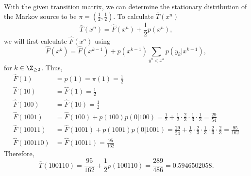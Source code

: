 \documentclass[
  coursecode={MTHE 477},
  assignmentname={Homework \homeworknumber},
  studentnumber=20053722,
  name={Bryan Hoang},
  draft,
  final,
]{
  ltxanswer%
}
\begin{document}
  \begin{questions}
    \setcounter{question}{\questionnumber}
    \addtocounter{question}{-1}
    \question[20]\
    \begin{parts}
      \part{}
      \begin{solution}
        With the given transition matrix, we can determine the stationary distribution of the Markov source to be \(\pi = (\frac{1}{2}, \frac{1}{2})\). To calculate \(\bar{T}(x^{n})\)
        \begin{equation*}
          \bar{T}(x^{n}) = \hat{F}(x^{n}) + \frac{1}{2} p(x^{n}),
        \end{equation*}
        we will first calculate \(\hat{F}(x^{n})\) using
        \begin{equation*}
          \hat{F}(x^{k}) = \hat{F}(x^{k-1}) + p(x^{k-1}) \sum_{y^{k} < x^{k}} p(y_{k}|x^{k-1}),
        \end{equation*}
        for \(k\in\Z_{\ge2}\). Thus,
        \begin{align*}
          \hat{F}(1)      &= p(1) = \pi(1) = \frac{1}{2}                                                                                                                             \\
          \hat{F}(10)     &= \hat{F}(1) = \frac{1}{2}                                                                                                                                \\
          \hat{F}(100)    &= \hat{F}(10) = \frac{1}{2}                                                                                                                               \\
          \hat{F}(1001)   &= \hat{F}(100) + p(100)p(0|100) = \frac{1}{2} + \frac{1}{2} \cdot \frac{2}{3} \cdot \frac{1}{3} \cdot \frac{1}{3} = \frac{29}{54}                         \\
          \hat{F}(10011)  &= \hat{F}(1001) + p(1001)p(0|1001) = \frac{29}{54} + \frac{1}{2} \cdot \frac{2}{3} \cdot \frac{1}{3} \cdot \frac{2}{3} \cdot \frac{2}{3} = \frac{95}{162} \\
          \hat{F}(100110) &= \hat{F}(10011) = \frac{95}{162}
        \end{align*}
        Therefore,
        \begin{equation*}
          \bar{T}(100110) = \frac{95}{162} + \frac{1}{2}p(100110) = \boxed{\frac{289}{486} = 0.5946502058}.
        \end{equation*}
      \end{solution}


\end{parts}
\end{questions}
\end{document}
